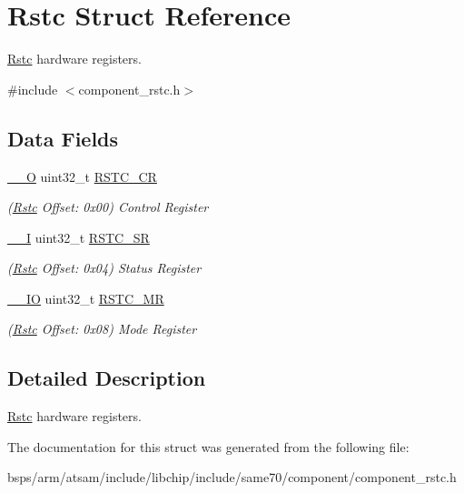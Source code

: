 \hypertarget{structRstc}{}\section{Rstc Struct Reference}
\label{structRstc}


\mbox{\hyperlink{structRstc}{Rstc}} hardware registers.  




{\ttfamily \#include $<$component\+\_\+rstc.\+h$>$}

\subsection*{Data Fields}
\begin{DoxyCompactItemize}
\item 
\mbox{\label{structRstc_a93addad3d19058599aeac30a19f09c0e}} 
\mbox{\hyperlink{core__cm7_8h_a7e25d9380f9ef903923964322e71f2f6}{\+\_\+\+\_\+O}} uint32\+\_\+t \mbox{\hyperlink{structRstc_a93addad3d19058599aeac30a19f09c0e}{R\+S\+T\+C\+\_\+\+CR}}
\begin{DoxyCompactList}\small\item\em (\mbox{\hyperlink{structRstc}{Rstc}} Offset\+: 0x00) Control Register \end{DoxyCompactList}\item 
\mbox{\label{structRstc_a52a8e1d8a6358b7fd40b830bc85d2544}} 
\mbox{\hyperlink{core__cm7_8h_af63697ed9952cc71e1225efe205f6cd3}{\+\_\+\+\_\+I}} uint32\+\_\+t \mbox{\hyperlink{structRstc_a52a8e1d8a6358b7fd40b830bc85d2544}{R\+S\+T\+C\+\_\+\+SR}}
\begin{DoxyCompactList}\small\item\em (\mbox{\hyperlink{structRstc}{Rstc}} Offset\+: 0x04) Status Register \end{DoxyCompactList}\item 
\mbox{\label{structRstc_a2184eb0dd1da96ae11d14e0f9c8ab554}} 
\mbox{\hyperlink{core__cm7_8h_aec43007d9998a0a0e01faede4133d6be}{\+\_\+\+\_\+\+IO}} uint32\+\_\+t \mbox{\hyperlink{structRstc_a2184eb0dd1da96ae11d14e0f9c8ab554}{R\+S\+T\+C\+\_\+\+MR}}
\begin{DoxyCompactList}\small\item\em (\mbox{\hyperlink{structRstc}{Rstc}} Offset\+: 0x08) Mode Register \end{DoxyCompactList}\end{DoxyCompactItemize}


\subsection{Detailed Description}
\mbox{\hyperlink{structRstc}{Rstc}} hardware registers. 

The documentation for this struct was generated from the following file\+:\begin{DoxyCompactItemize}
\item 
bsps/arm/atsam/include/libchip/include/same70/component/component\+\_\+rstc.\+h\end{DoxyCompactItemize}
